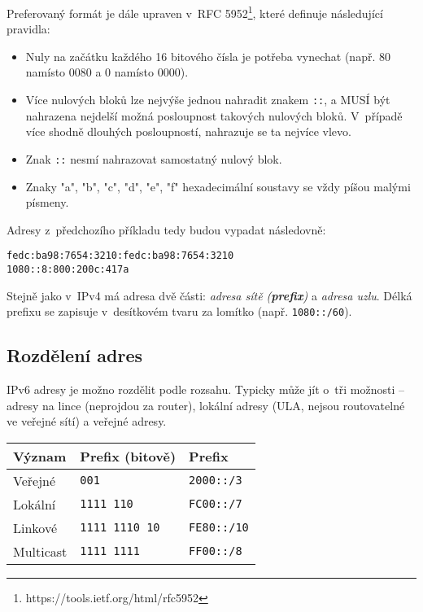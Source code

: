 Preferovaný formát je dále upraven v~RFC 5952\footnote{https://tools.ietf.org/html/rfc5952}, které definuje následující
pravidla:
\begin{itemize}
    \item Nuly na začátku každého 16 bitového čísla je potřeba vynechat (např.
        80 namísto 0080 a 0 namísto 0000).
    \item Více nulových bloků lze nejvýše jednou nahradit znakem {\tt ::}, a
        MUSÍ být nahrazena nejdelší možná posloupnost takových nulových bloků.
        V~případě více shodně dlouhých posloupností, nahrazuje se ta nejvíce
        vlevo.
    \item Znak {\tt ::} nesmí nahrazovat samostatný nulový blok.
    \item Znaky "a", "b", "c", "d", "e", "f" hexadecimální soustavy se vždy
        píšou malými písmeny.
\end{itemize}
Adresy z~předchozího příkladu tedy budou vypadat následovně:\\
\begin{verbatim}
fedc:ba98:7654:3210:fedc:ba98:7654:3210
1080::8:800:200c:417a
\end{verbatim}

Stejně jako v~IPv4 má adresa dvě části: \emph{adresa sítě ({\bf prefix})} a
\emph{adresa uzlu}. Délká prefixu se zapisuje v~desítkovém tvaru za lomítko
(např. {\tt 1080::/60}).

\subsection{Rozdělení adres}
IPv6 adresy je možno rozdělit podle rozsahu. Typicky může jít o~tři
možnosti -- adresy na lince (neprojdou za router), lokální adresy (ULA, nejsou
routovatelné ve veřejné sítí) a veřejné adresy.

\begin{table}[ht!]
    \begin{center}
        \begin{tabular}{l|l|l}
            Význam & Prefix (bitově) & Prefix \\
            \hline\hline
            Veřejné  & {\tt 001} & {\tt 2000::/3} \\
            \hline
            Lokální  & {\tt 1111 110} & {\tt FC00::/7} \\
            \hline
            Linkové  & {\tt 1111 1110 10} & {\tt FE80::/10} \\
            \hline
            Multicast & {\tt 1111 1111} & {\tt FF00::/8} \\
            \hline
        \end{tabular}
    \end{center}
\end{table}

